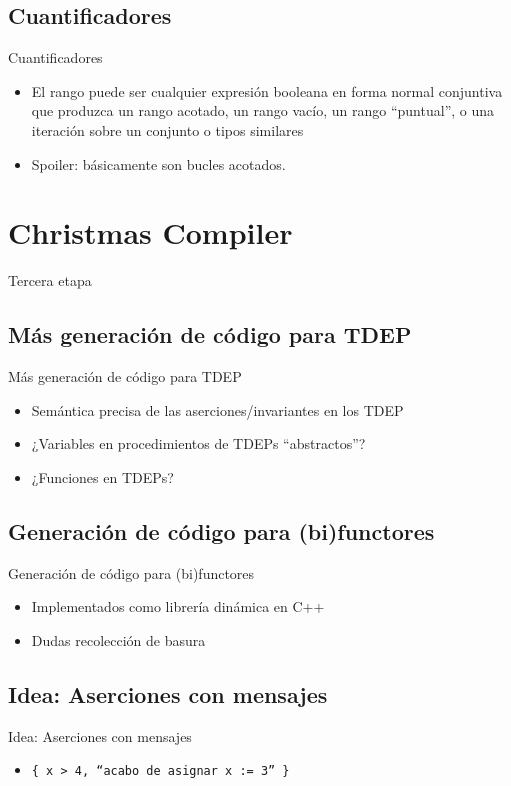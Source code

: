 \documentclass{beamer}
\begin{document}
\subsection{Cuantificadores}
\begin{frame}{Cuantificadores}
\begin{itemize}
  \item El rango puede ser cualquier expresión booleana en forma normal
    conjuntiva que produzca un rango acotado, un rango vacío,
    un rango ``puntual'', o una iteración sobre un conjunto o tipos similares
  \item Spoiler: básicamente son bucles acotados.
\end{itemize}
\end{frame}

\section{Christmas Compiler}

\begin{frame}
\LARGE{Tercera etapa}
\end{frame}

\subsection{Más generación de código para TDEP}
\begin{frame}{Más generación de código para TDEP}
\begin{itemize}
  \item Semántica precisa de las aserciones/invariantes en los TDEP
  \item ¿Variables en procedimientos de TDEPs ``abstractos''?
  \item ¿Funciones en TDEPs?
\end{itemize}
\end{frame}

\subsection{Generación de código para (bi)functores}
\begin{frame}{Generación de código para (bi)functores}
\begin{itemize}
  \item Implementados como librería dinámica en C++
  \item Dudas recolección de basura
\end{itemize}
\end{frame}


\subsection{Idea: Aserciones con mensajes}
\begin{frame}{Idea: Aserciones con mensajes}
\begin{itemize}
  \item \texttt{\{ x > 4, ``acabo de asignar x := 3'' \}}
\end{itemize}
\end{frame}
\end{document}
